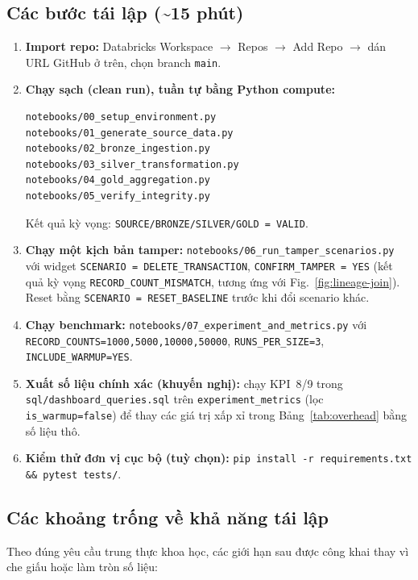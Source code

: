 \subsection{Các bước tái lập (\textasciitilde15 phút)}

\begin{enumerate}
\item \textbf{Import repo:} Databricks Workspace $\to$ Repos $\to$ Add Repo $\to$ dán URL GitHub ở trên, chọn branch \texttt{main}.
\item \textbf{Chạy sạch (clean run), tuần tự bằng Python compute:}
\begin{verbatim}
notebooks/00_setup_environment.py
notebooks/01_generate_source_data.py
notebooks/02_bronze_ingestion.py
notebooks/03_silver_transformation.py
notebooks/04_gold_aggregation.py
notebooks/05_verify_integrity.py
\end{verbatim}
Kết quả kỳ vọng: \texttt{SOURCE/BRONZE/SILVER/GOLD = VALID}.
\item \textbf{Chạy một kịch bản tamper:} \texttt{notebooks/06\_run\_tamper\_scenarios.py} với widget \texttt{SCENARIO = DELETE\_TRANSACTION}, \texttt{CONFIRM\_TAMPER = YES} (kết quả kỳ vọng \texttt{RECORD\_COUNT\_MISMATCH}, tương ứng với Fig.~\ref{fig:lineage-join}). Reset bằng \texttt{SCENARIO = RESET\_BASELINE} trước khi đổi scenario khác.
\item \textbf{Chạy benchmark:} \texttt{notebooks/07\_experiment\_and\_metrics.py} với \texttt{RECORD\_COUNTS=1000,5000,10000,50000}, \texttt{RUNS\_PER\_SIZE=3}, \texttt{INCLUDE\_WARMUP=YES}.
\item \textbf{Xuất số liệu chính xác (khuyến nghị):} chạy KPI~8/9 trong \texttt{sql/dashboard\_queries.sql} trên \texttt{experiment\_metrics} (lọc \texttt{is\_warmup=false}) để thay các giá trị xấp xỉ trong Bảng~\ref{tab:overhead} bằng số liệu thô.
\item \textbf{Kiểm thử đơn vị cục bộ (tuỳ chọn):} \texttt{pip install -r requirements.txt \&\& pytest tests/}.
\end{enumerate}

\subsection{Các khoảng trống về khả năng tái lập}

Theo đúng yêu cầu trung thực khoa học, các giới hạn sau được công khai
thay vì che giấu hoặc làm tròn số liệu:

